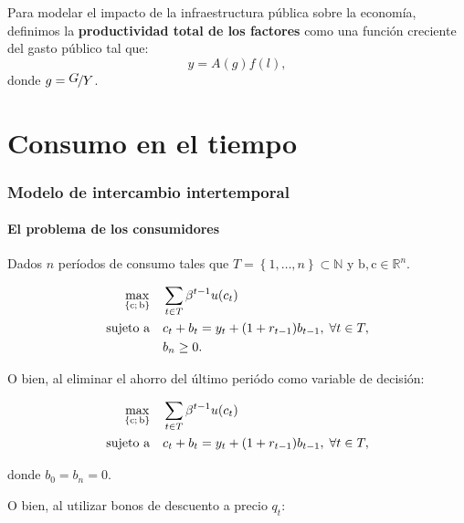 \documentclass[8pt,a4paper]{extarticle}
\begin{document}
\begin{multicols}{3}
	\begin{boxdef}
		Para modelar el impacto de la infraestructura pública sobre la economía, definimos la \textbf{productividad total de los factores} como una función creciente del gasto público tal que:
		\[y = A(g)f(l),\]
		donde $g = \displaystyle \nicefrac{\displaystyle G}{\displaystyle Y}$.
	\end{boxdef}

	\newpage

	\part{Consumo en el tiempo}

	\section{Modelo de intercambio intertemporal}

	\subsection{El problema de los consumidores}

	Dados $n$ períodos de consumo tales que $T = \left\{ 1, \dots, n \right\} \subset \mathbb{N}$ y $\mathrm{b}, \mathrm{c} \in \mathbb{R}^n$.

	\begin{align*}
		\max_{\left\{ \mathrm{c};\, \mathrm{b} \right\}} \quad & \sum_{t \in T} \beta^{t-1} u(c_t)                           \\
		\textnormal{sujeto a} \quad                            & c_t + b_t = y_t + (1 + r_{t-1}) b_{t-1},\; \forall t \in T, \\
		                                                       & b_n \geq 0.
	\end{align*}

	O bien, al eliminar el ahorro del último periódo como variable de decisión:

	\begin{align*}
		\max_{\left\{ \mathrm{c};\, \mathrm{b} \right\}} \quad & \sum_{t \in T} \beta^{t-1} u(c_t)                           \\
		\textnormal{sujeto a} \quad                            & c_t + b_t = y_t + (1 + r_{t-1}) b_{t-1},\; \forall t \in T,
	\end{align*}

	donde $b_0 = b_n = 0$.

	O bien, al utilizar bonos de descuento a precio $q_t$:


\end{multicols}
\end{document}
